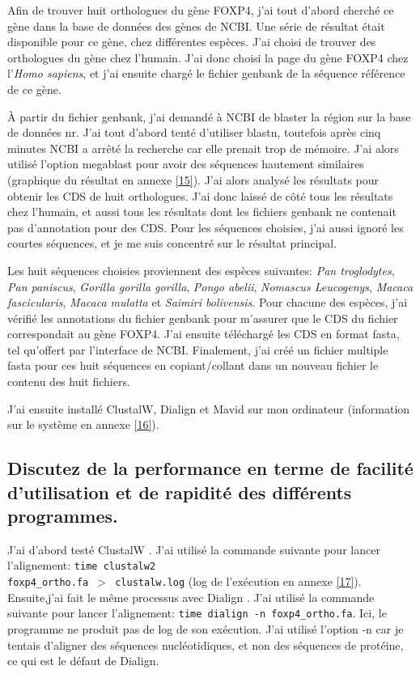 \documentclass[10.9pt]{article} %
\begin{document}
Afin de trouver huit orthologues du gène FOXP4, j'ai tout d'abord cherché ce gène dans la base de
données des gènes de NCBI. Une série de résultat était disponible pour ce gène, chez différentes
espèces. J'ai choisi de trouver des orthologues du gène chez l'humain. J'ai donc choisi la page 
du gène FOXP4 chez l'\emph{Homo sapiens}, et j'ai ensuite chargé le fichier genbank de la séquence 
référence de ce gène.

À partir du fichier genbank, j'ai demandé à NCBI de blaster la région sur la base de données nr.
J'ai tout d'abord tenté d'utiliser blastn, toutefois après cinq minutes NCBI a arrêté la 
recherche car elle prenait trop de mémoire. J'ai alors utilisé l'option megablast pour avoir 
des séquences hautement similaires (graphique du résultat en annexe \ref{15}). 
J'ai alors analysé les résultats pour obtenir les CDS de huit orthologues. 
J'ai donc laissé de côté tous les résultats chez l'humain, et aussi tous les résultats dont
les fichiers genbank ne contenait pas d'annotation pour des CDS. Pour les séquences choisies, 
j'ai aussi ignoré les courtes séquences, et je me suis concentré sur le résultat principal.

Les huit séquences choisies proviennent des espèces suivantes: \emph{Pan troglodytes}, 
\emph{Pan paniscus}, \emph{Gorilla gorilla gorilla}, \emph{Pongo abelii}, \emph{Nomascus Leucogenys}, 
\emph{Macaca fascicularis}, \emph{Macaca mulatta} et \emph{Saimiri bolivensis}. Pour chacune des espèces, 
j'ai vérifié les annotations du fichier genbank pour m'assurer que le CDS du fichier 
correspondait au gène FOXP4. J'ai ensuite téléchargé les CDS en format fasta, tel qu'offert par
l'interface de NCBI. Finalement, j'ai créé un fichier multiple fasta pour ces huit séquences en
copiant/collant dans un nouveau fichier le contenu des huit fichiers.

J'ai ensuite installé ClustalW, Dialign et Mavid sur mon ordinateur 
(information sur le système en annexe \ref{16}).

\subsection[Facilité et rapidité des programmes]{Discutez de la performance en terme de facilité
d'utilisation et de rapidité des différents programmes.}

J'ai d'abord testé ClustalW \cite{CLUSTALW}. J'ai utilisé la commande suivante pour lancer l'alignement: 
\texttt{time clustalw2}\\ \texttt{foxp4\_ortho.fa $>$ clustalw.log} (log de l'exécution 
en annexe \ref{17}). Ensuite,j'ai fait le même processus avec Dialign \cite{DIALIGN}. J'ai utilisé la commande
suivante pour lancer l'alignement: \texttt{time dialign -n foxp4\_ortho.fa}. Ici, le programme ne
produit pas de log de son exécution. J'ai utilisé l'option -n car je tentais d'aligner des 
séquences nucléotidiques, et non des séquences de protéine, ce qui est le défaut de Dialign.
\end{document}
